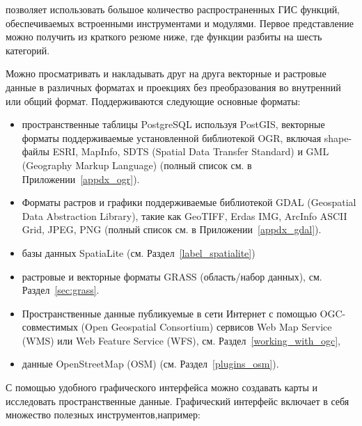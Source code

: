 \label{label_majfeat}

\qg позволяет использовать большое количество распространенных ГИС функций,
обеспечиваемых встроенными инструментами и модулями. Первое представление
можно получить  из краткого резюме ниже, где функции разбиты на шесть
категорий.


Можно просматривать и накладывать друг на друга векторные и растровые
данные в различных форматах и проекциях без преобразования во внутренний
или общий формат. Поддерживаются следующие основные форматы:

\begin{itemize}[label=--]
\item пространственные таблицы PostgreSQL используя PostGIS, векторные
форматы
поддерживаемые установленной библиотекой OGR, включая shape-файлы ESRI,
MapInfo, SDTS (Spatial Data Transfer Standard) и GML (Geography Markup
Language) (полный список см. в Приложении~\ref{appdx_ogr}).
\item Форматы растров и графики поддерживаемые
библиотекой GDAL (Geospatial Data Abstraction Library), такие как
GeoTIFF, Erdas IMG, ArcInfo ASCII Grid, JPEG, PNG (полный список см. в
Приложении~\ref{appdx_gdal}).
\item базы данных SpatiaLite (см. Раздел~\ref{label_spatialite})
\item растровые и векторные форматы GRASS (область/набор данных),
см. Раздел~\ref{sec:grass}.
\item Пространственные данные публикуемые в сети Интернет с помощью
OGC-совместимых (Open Geospatial Consortium) сервисов Web Map Service
(WMS) или Web Feature Service (WFS), см. Раздел~\ref{working_with_ogc},
\item данные OpenStreetMap (OSM) (см. Раздел~\ref{plugins_osm}).
\end{itemize}


С помощью удобного графического интерфейса можно создавать карты и
исследовать пространственные данные. Графический интерфейс включает в
себя множество полезных инструментов,например:

